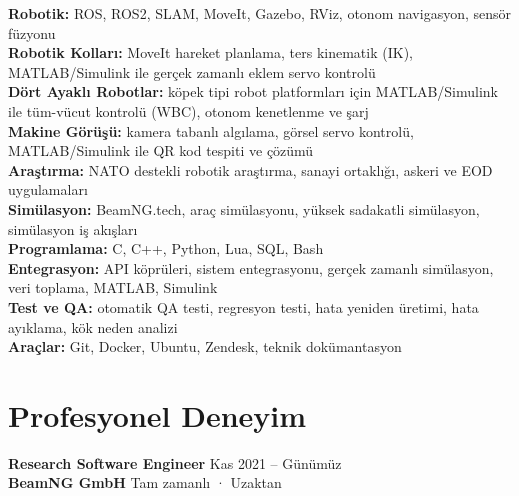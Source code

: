 \documentclass[11pt,a4paper]{article}
\begin{document}
{\small
\textbf{Robotik:} ROS, ROS2, SLAM, MoveIt, Gazebo, RViz, otonom navigasyon, sensör füzyonu\\
\textbf{Robotik Kolları:} MoveIt hareket planlama, ters kinematik (IK), MATLAB/Simulink ile gerçek zamanlı eklem servo kontrolü\\
\textbf{Dört Ayaklı Robotlar:} köpek tipi robot platformları için MATLAB/Simulink ile tüm-vücut kontrolü (WBC), otonom kenetlenme ve şarj\\
\textbf{Makine Görüşü:} kamera tabanlı algılama, görsel servo kontrolü, MATLAB/Simulink ile QR kod tespiti ve çözümü\\
\textbf{Araştırma:} NATO destekli robotik araştırma, sanayi ortaklığı, askeri ve EOD uygulamaları\\
\textbf{Simülasyon:} BeamNG.tech, araç simülasyonu, yüksek sadakatli simülasyon, simülasyon iş akışları\\
\textbf{Programlama:} C, C++, Python, Lua, SQL, Bash\\
\textbf{Entegrasyon:} API köprüleri, sistem entegrasyonu, gerçek zamanlı simülasyon, veri toplama, MATLAB, Simulink\\
\textbf{Test ve QA:} otomatik QA testi, regresyon testi, hata yeniden üretimi, hata ayıklama, kök neden analizi\\
\textbf{Araçlar:} Git, Docker, Ubuntu, Zendesk, teknik dokümantasyon
}

\section*{Profesyonel Deneyim}

\textbf{Research Software Engineer} \hfill Kas 2021 -- Günümüz\\
\textbf{BeamNG GmbH} \hfill Tam zamanlı · Uzaktan
\end{document}
